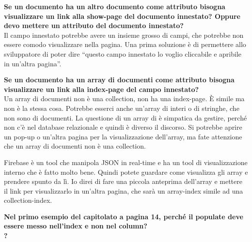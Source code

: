 \begin{itemize}
		{\bfseries Se un documento ha un altro documento come attributo bisogna visualizzare un link alla show-page del documento innestato? Oppure devo mettere un attributo del documento innestato?} \\
		Il campo innestato potrebbe avere un insieme grosso di campi, che potrebbe non essere comodo visualizzare nella pagina. Una prima soluzione è di permettere allo sviluppatore di poter dire ``questo campo innestato lo voglio cliccabile e apribile in un'altra pagina''.
		
		{\bfseries Se un documento ha un array di documenti come attributo bisogna visualizzare un link alla index-page del campo innestato?} \\
		Un array di documenti non è una collection, non ha una index-page. È simile ma non è la stessa cosa. Potrebbe esserci anche un'array di interi o di stringhe, che non sono di documenti. La questione di un array di è simpatica da gestire, perché non c'è nel database relazionale e quindi è diverso il discorso. Si potrebbe aprire un pop-up o un'altra pagina per la visualizzazione dell'array, ma fate attenzione che un array di documenti non è una collection.
		
		Firebase è un tool che manipola JSON in real-time e ha un tool di visualizzazione interno che è fatto molto bene. Quindi potete guardare come visualizza gli array e prendere spunto da lì. Io direi di fare una piccola anteprima dell'array e mettere il link per visualizzarlo in un'altra pagina, che sarà un array-index simile ad una collection-index.
		
		{\bfseries Nel primo esempio del capitolato a pagina 14, perché il populate deve essere messo nell'index e non nel column?} \\
		
		{\bfseries ?} \\
		
		
	\end{itemize}